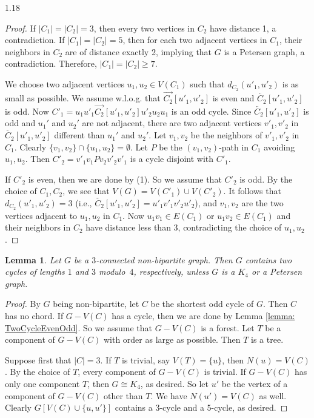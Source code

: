 \documentclass[10pt]{article}
\newtheorem{lemma}[theorem]{Lemma}
\begin{document}
\begin{spacing}{1.18}
\begin{proof}
    If $|C_1|=|C_2|=3$, then every two vertices in $C_2$ have distance 1, a contradiction. If $|C_1|=|C_2|=5$, then for each two adjacent vertices in $C_1$, their neighbors in $C_2$ are of distance exactly 2, implying that $G$ is a Petersen graph, a contradiction. Therefore, $|C_1|=|C_2|\geqslant 7$.

    We choose two adjacent vertices $u_1,u_2\in V(C_1)$ such that $d_{C_2}(u'_1,u'_2)$ is as small as possible. We assume w.l.o.g. that $\overrightarrow{C_2}[u'_1,u'_2]$ is even and $\overleftarrow{C_2}[u'_1,u'_2]$ is odd. Now $C'_1=u_1u'_1\overrightarrow{C_2}[u'_1,u'_2]u'_2u_2u_1$ is an odd cycle. Since $\overleftarrow{C_2}[u'_1,u'_2]$ is odd and $u_1'$ and $u_2'$ are not adjacent, there are two adjacent vertices $v'_1,v'_2$ in $\overleftarrow{C_2}[u'_1,u'_2]$ different than $u_1'$ and $u_2'$. Let $v_1,v_2$ be the neighbors of $v'_1,v'_2$ in $C_1$. Clearly $\{v_1,v_2\}\cap\{u_1,u_2\}=\emptyset$. Let $P$ be the $(v_1,v_2)$-path in $C_1$ avoiding $u_1,u_2$. Then $C'_2=v'_1v_1Pv_2v'_2v'_1$ is a cycle disjoint with $C'_1$.

    If $C'_2$ is even, then we are done by (1). So we assume that $C'_2$ is odd. By the choice of $C_1,C_2$, we see that $V(G)=V(C'_1)\cup V(C'_2)$. It follows that $d_{C_2}(u'_1,u'_2)=3$ (i.e., $\overleftarrow{C_2}[u'_1,u'_2]=u'_1v'_1v'_2u'_2$), and $v_1,v_2$ are the two vertices adjacent to $u_1,u_2$ in $C_1$. Now $u_1v_1\in E(C_1)$ or $u_1v_2\in E(C_1)$ and their neighbors in $C_2$ have distance less than 3, contradicting the choice of $u_1,u_2$.
\end{proof}

\begin{lemma}\label{lemma: two consecutive odd cycles}
    Let $G$ be a $3$-connected non-bipartite graph. Then $G$ contains two cycles of lengths $1$ and $3$ modulo~$4$, respectively, unless $G$ is a $K_4$ or a Petersen graph.
\end{lemma}

\begin{proof}
    By $G$ being non-bipartite, let $C$ be the shortest odd cycle of $G$. Then $C$ has no chord. If $G-V(C)$ has a cycle, then we are done by Lemma \ref{lemma: TwoCycleEvenOdd}. So we assume that $G-V(C)$ is a forest. Let $T$ be a component of $G-V(C)$ with order as large as possible. Then $T$ is a tree.

    Suppose first that $|C|=3$. If $T$ is trivial, say $V(T)=\{u\}$, then $N(u)=V(C)$. By the choice of $T$, every component of $G-V(C)$ is trivial. If $G-V(C)$ has only one component $T$, then $G\cong K_4$, as desired. So let $u'$ be the vertex of a component of $G-V(C)$ other than $T$. We have $N(u')=V(C)$ as well. Clearly $G[V(C)\cup\{u,u'\}]$ contains a 3-cycle and a 5-cycle, as desired.


\end{proof}
\end{spacing}
\end{document}
